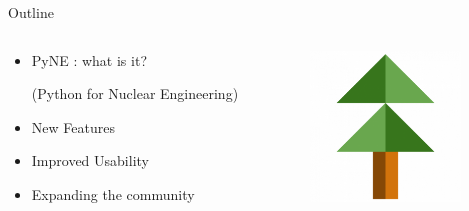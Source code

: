 \documentclass[xcolor=x11names,compress]{beamer}
\begin{document}
\begin{frame}{Outline}
    \Large
	\begin{columns}
  	\begin{column}{0.5\textwidth}
	    \begin{itemize}
        \item PyNE \cite{pyne}: what is it?

        (Python for Nuclear Engineering)
        \item New Features
        \item Improved Usability
        \item Expanding the community
	    \end{itemize}
  	\end{column}
 	\begin{column}{0.4\textwidth}
 	   \begin{center}
 	   \begin{figure}
       \includegraphics[height=4cm]{pyne-icon-big.png}
	   \end{figure}
 	   \end{center}
  	\end{column}
	\end{columns}

\end{frame}

\end{document}
